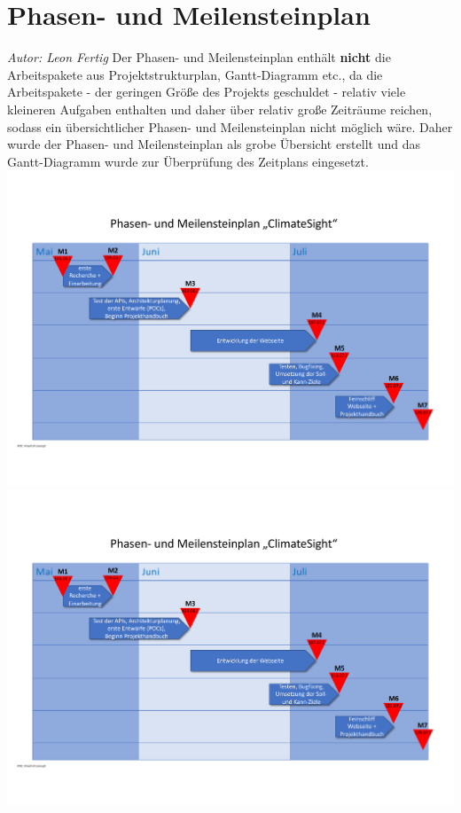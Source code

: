 \documentclass[12pt]{article}
\begin{document}
\section{Phasen- und Meilensteinplan}
{\it Autor: Leon Fertig}
\newline
Der Phasen- und Meilensteinplan enthält {\bf nicht} die Arbeitspakete aus Projektstrukturplan, Gantt-Diagramm etc., da die Arbeitspakete - der geringen Größe des Projekts geschuldet - relativ viele kleineren Aufgaben enthalten und daher über relativ große Zeiträume reichen, sodass ein übersichtlicher Phasen- und Meilensteinplan nicht möglich wäre. Daher wurde der Phasen- und Meilensteinplan als grobe Übersicht erstellt und das Gantt-Diagramm wurde zur Überprüfung des Zeitplans eingesetzt.
\newline
\includegraphics[width=\textwidth, page=1]{Planungsdokumente/graphics/Meilensteinplan.pdf}
\includegraphics[width=\textwidth, page=2]{Planungsdokumente/graphics/Meilensteinplan.pdf}
\end{document}
